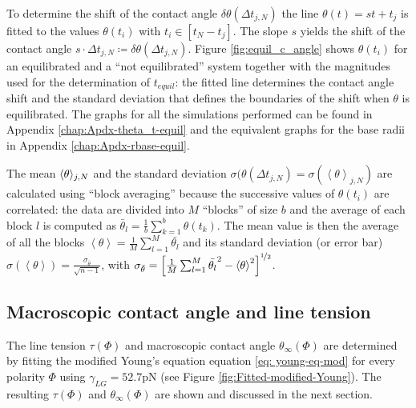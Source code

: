 To determine the shift of the contact angle $\delta\theta(\Delta t_{j,N})$
the line $\theta(t)=st+t_{j}$ is fitted to the values $\theta(t_{i})$
with $t_{i}\in\left[t_{N}-t_{j}\right]$. The slope $s$ yields the
shift of the contact angle $s\cdot\varDelta t_{j,N}\coloneqq\delta\theta(\varDelta t_{j,N})$.
Figure \ref{fig:equil_c_angle} shows $\theta(t_{i})$ for an equilibrated
and a ``not equilibrated'' system together with the magnitudes used
for the determination of $t_{equil}$: the fitted line determines
the contact angle shift and the standard deviation that defines the
boundaries of the shift when $\theta$ is equilibrated. The graphs
for all the simulations performed can be found in Appendix \ref{chap:Apdx-theta_t-equil}
and the equivalent graphs for the base radii in Appendix \ref{chap:Apdx-rbase-equil}.

The mean $\text{\textlangle}\theta\rangle_{j,N}$ and the standard
deviation $\sigma(\theta(\Delta t_{j,N})=\sigma\left(\left\langle \theta\right\rangle _{j,N}\right)$
are calculated using ``block averaging'' because the successive
values of $\theta(t_{i})$ are correlated: the data are divided into
$M$ ``blocks'' of size $b$ and the average of each block $l$
is computed as $\bar{\theta}_{l}=\frac{1}{b}\sum_{k=1}^{b}\theta(t_{k})$.
The mean value is then the average of all the blocks $\left\langle \theta\right\rangle =\frac{1}{M}\sum_{l=1}^{M}\bar{\theta_{l}}$
and its standard deviation (or error bar) $\sigma(\left\langle \theta\right\rangle )=\frac{\sigma_{\bar{\theta}}}{\sqrt{n-1}}$,
with $\sigma_{\bar{\theta}}=\left[\frac{1}{M}\sum_{l=1}^{M}\bar{\theta_{l}}^{2}-\left\langle \theta\right\rangle ^{2}\right]^{\nicefrac{1}{2}}$.

\subsection{Macroscopic contact angle and line tension}

The line tension $\tau(\Phi)$ and macroscopic contact angle $\theta_{\infty}(\Phi)$
are determined by fitting the modified Young's equation \textendash{}
equation \ref{eq: young-eq-mod} \textendash{} for every polarity
$\Phi$ using $\gamma_{LG}=52.7\mathrm{pN}$ \cite{sedlmeier:2008}
(see Figure \ref{fig:Fitted-modified-Young}). The resulting $\tau(\Phi)$
and $\theta_{\infty}(\Phi)$ are shown and discussed in the next section.